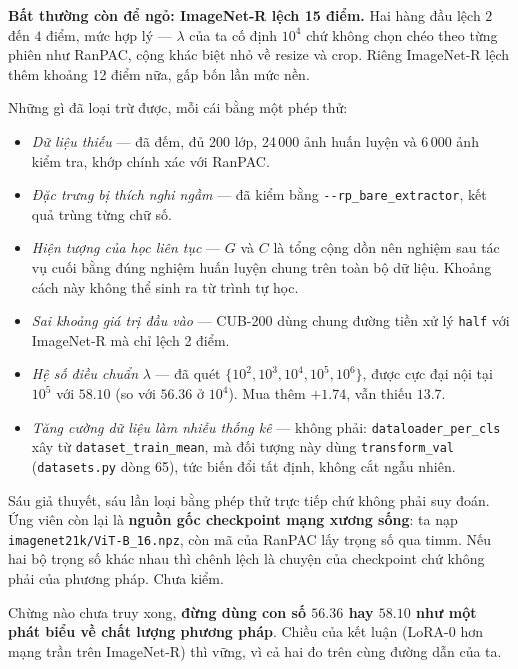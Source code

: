 \documentclass[11pt,a4paper]{article}
\newenvironment{luuy}{\begin{leftbar}\noindent\ignorespaces}{\end{leftbar}}
\begin{document}
\begin{luuy}
\textbf{Bất thường còn để ngỏ: ImageNet-R lệch 15 điểm.} Hai hàng đầu lệch $2$
đến $4$ điểm, mức hợp lý --- $\lambda$ của ta cố định $10^4$ chứ không chọn chéo
theo từng phiên như RanPAC, cộng khác biệt nhỏ về resize và crop. Riêng
ImageNet-R lệch thêm khoảng 12 điểm nữa, gấp bốn lần mức nền.

Những gì đã loại trừ được, mỗi cái bằng một phép thử:
\begin{itemize}
\item \emph{Dữ liệu thiếu} --- đã đếm, đủ 200 lớp, 24\,000 ảnh huấn luyện và
      6\,000 ảnh kiểm tra, khớp chính xác với RanPAC.
\item \emph{Đặc trưng bị thích nghi ngầm} --- đã kiểm bằng
      \texttt{-{}-rp\_bare\_extractor}, kết quả trùng từng chữ số.
\item \emph{Hiện tượng của học liên tục} --- $G$ và $C$ là tổng cộng dồn nên
      nghiệm sau tác vụ cuối bằng đúng nghiệm huấn luyện chung trên toàn bộ dữ
      liệu. Khoảng cách này không thể sinh ra từ trình tự học.
\item \emph{Sai khoảng giá trị đầu vào} --- CUB-200 dùng chung đường tiền xử lý
      \texttt{half} với ImageNet-R mà chỉ lệch 2 điểm.
\item \emph{Hệ số điều chuẩn} $\lambda$ --- đã quét
      $\{10^2, 10^3, 10^4, 10^5, 10^6\}$, được cực đại nội tại $10^5$ với
      $58.10$ (so với $56.36$ ở $10^4$). Mua thêm $+1.74$, vẫn thiếu $13.7$.
\item \emph{Tăng cường dữ liệu làm nhiễu thống kê} --- không phải:
      \texttt{dataloader\_per\_cls} xây từ \texttt{dataset\_train\_mean}, mà
      đối tượng này dùng \texttt{transform\_val} (\texttt{datasets.py} dòng 65),
      tức biến đổi tất định, không cắt ngẫu nhiên.
\end{itemize}

Sáu giả thuyết, sáu lần loại bằng phép thử trực tiếp chứ không phải suy đoán.
Ứng viên còn lại là \textbf{nguồn gốc checkpoint mạng xương sống}: ta nạp
\texttt{imagenet21k/ViT-B\_16.npz}, còn mã của RanPAC lấy trọng số qua timm.
Nếu hai bộ trọng số khác nhau thì chênh lệch là chuyện của checkpoint chứ không
phải của phương pháp. Chưa kiểm.

Chừng nào chưa truy xong, \textbf{đừng dùng con số $56.36$ hay $58.10$ như một
phát biểu về chất lượng phương pháp}. Chiều của kết luận (LoRA-0 hơn mạng trần
trên ImageNet-R) thì vững, vì cả hai đo trên cùng đường dẫn của ta.
\end{luuy}
\end{document}
